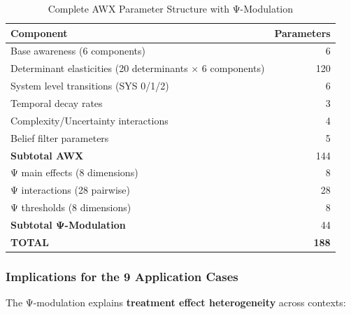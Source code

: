 \begin{table}[htbp]
\centering
\caption{Complete AWX Parameter Structure with Ψ-Modulation}
\label{tab:parameter-count-psi}
\small
\begin{tabular}{@{}lr@{}}
\toprule
\textbf{Component} & \textbf{Parameters} \\
\midrule
Base awareness (6 components) & 6 \\
Determinant elasticities (20 determinants × 6 components) & 120 \\
System level transitions (SYS 0/1/2) & 6 \\
Temporal decay rates & 3 \\
Complexity/Uncertainty interactions & 4 \\
Belief filter parameters & 5 \\
\midrule
\textbf{Subtotal AWX} & 144 \\
\midrule
Ψ main effects (8 dimensions) & 8 \\
Ψ interactions (28 pairwise) & 28 \\
Ψ thresholds (8 dimensions) & 8 \\
\midrule
\textbf{Subtotal Ψ-Modulation} & 44 \\
\midrule
\textbf{TOTAL} & \textbf{188} \\
\bottomrule
\end{tabular}
\end{table}

\subsubsection{Implications for the 9 Application Cases}

The Ψ-modulation explains \textbf{treatment effect heterogeneity} across contexts:

